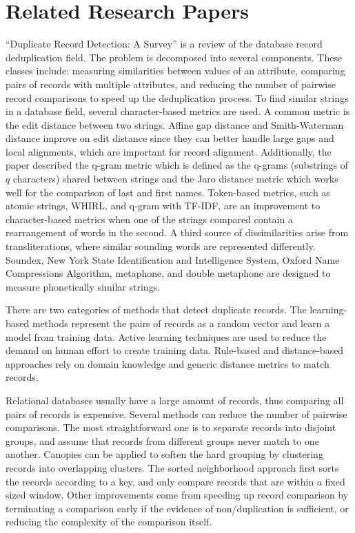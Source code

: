 \documentclass[]{article}
\begin{document}
\section{Related Research Papers} %
\label{sec:appropriate_papers}
``Duplicate Record Detection: A Survey'' \cite{Elmagarmid2007} is a review of the database record deduplication field.  The problem is decomposed into several components. These classes include: measuring similarities between values of an attribute, comparing pairs of records with multiple attributes, and reducing the number of pairwise record comparisons to speed up the deduplication process.  To find similar strings in a database field, several character-based metrics are used.  A common metric is the edit distance between two strings.  Affine gap distance and Smith-Waterman distance improve on edit distance since they can better handle large gaps and local alignments, which are important for record alignment.  Additionally, the paper described the q-gram metric which is defined as the q-grams (substrings of $q$ characters) shared between strings and the Jaro distance metric which works well for the comparison of last and first names.  Token-based metrics, such as atomic strings, WHIRL, and q-gram with TF-IDF, are an improvement to character-based metrics when one of the strings compared contain a rearrangement of words in the second.  A third source of dissimilarities arise from transliterations, where similar sounding words are represented differently.  Soundex, New York State Identification and Intelligence System, Oxford Name Compressions Algorithm, metaphone, and double metaphone are designed to measure phonetically similar strings.  

There are two categories of methods that detect duplicate records.
The learning-based methods represent the pairs of records as a random vector and learn a model from training data.
Active learning techniques are used to reduce the demand on human effort to create training data.  Rule-based and distance-based approaches rely on domain knowledge and generic distance metrics to match records.

Relational databases usually have a large amount of records, thus comparing all pairs of records is expensive.  Several methods can reduce the number of pairwise comparisons.  The most straightforward one is to separate records into disjoint groups, and assume that records from different groups never match to one another.  Canopies can be applied to soften the hard grouping by clustering records into overlapping clusters.  The sorted neighborhood approach first sorts the records according to a key, and only compare records that are within a fixed sized window.  Other improvements come from speeding up record comparison by terminating a comparison early if the evidence of non/duplication is sufficient, or reducing the complexity of the comparison itself.
\end{document}
